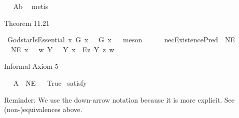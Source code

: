 \begin{isabellebody}
\isadelimproof
\ %
\endisadelimproof
%
\isatagproof
{}\isamarkupfalse%
\ A{}b\ \isamarkupfalse%
\ metis%
\endisatagproof
{\isafoldproof}%
%
\isadelimproof
%
\endisadelimproof
%
\begin{isamarkuptext}%
Theorem 11.21%
\end{isamarkuptext}\isamarkuptrue%
\isamarkupfalse%
\ God{\isacharunderscore}starIsEssential{\isacharcolon}\ {\isachardoublequoteopen}{\isasymlfloor}\isactrlbold {\isasymforall}x{\isachardot}\ G{\isacharasterisk}\ x\ \isactrlbold {\isasymrightarrow}\ {\isacharparenleft}{\isacharparenleft}{\isasymE}\ {\isasymdown}G{\isacharasterisk}{\isacharparenright}\ x{\isacharparenright}{\isasymrfloor}{\isachardoublequoteclose}%
\isadelimproof
\ %
\endisadelimproof
%
\isatagproof
{}\isamarkupfalse%
\ meson%
\endisatagproof
{\isafoldproof}%
%
\isadelimproof
%
\endisadelimproof
\isanewline
\ \ \ \ \isanewline
{}\isamarkupfalse%
\ necExistencePred{\isacharcolon}{\isacharcolon}\ {\isachardoublequoteopen}{\isasymup}{\isasymlangle}{\isasymzero}{\isasymrangle}{\isachardoublequoteclose}\ {\isacharparenleft}{\isachardoublequoteopen}NE{\isachardoublequoteclose}{\isacharparenright}\ \isanewline
\ \ {\isachardoublequoteopen}NE\ x\ \ {\isasymequiv}\ {\isasymlambda}w{\isachardot}\ {\isacharparenleft}\isactrlbold {\isasymforall}Y{\isachardot}\ \ {\isasymE}\ Y\ x\ \isactrlbold {\isasymrightarrow}\ \isactrlbold {\isasymbox}{\isacharparenleft}\isactrlbold {\isasymexists}\isactrlsup Ez{\isachardot}\ {\isasymlparr}Y\ z{\isasymrparr}{\isacharparenright}{\isacharparenright}\ w{\isachardoublequoteclose}%
\begin{isamarkuptext}%
Informal Axiom 5%
\end{isamarkuptext}\isamarkuptrue%
\isamarkupfalse%
\ \isanewline
\ A{}{\isacharcolon}\ {\isachardoublequoteopen}{\isasymlfloor}{\isasymP}\ {\isasymdown}NE{\isasymrfloor}{\isachardoublequoteclose}\isanewline
\ \isanewline
{}\isamarkupfalse%
\ True\ \isamarkupfalse%
{\isacharbrackleft}satisfy{\isacharbrackright}%
\isadelimproof
\ %
\endisadelimproof
%
\isatagproof
{}\isamarkupfalse%
\ %
%
\endisatagproof
{\isafoldproof}%
%
\isadelimproof
%
\endisadelimproof
%
\begin{isamarkuptext}%
Reminder: We use the down-arrow notation because it is more explicit. See (non-)equivalences above.%

\end{isamarkuptext}
\end{isabellebody}
